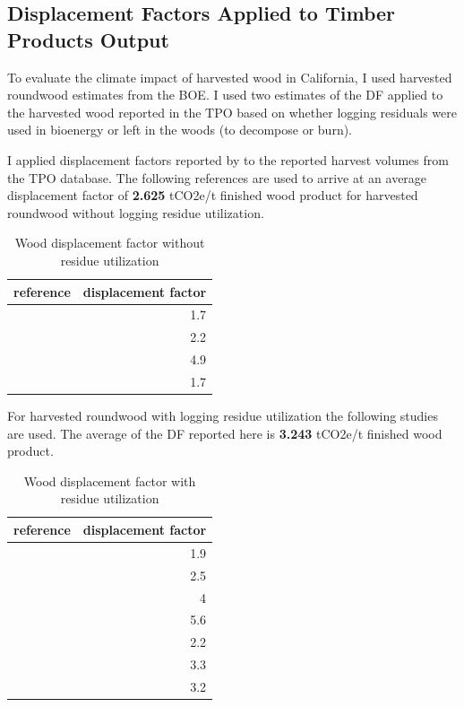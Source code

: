 \documentclass[a4paper,titlepage]{article}
\begin{document}
\subsection{Displacement Factors Applied to Timber Products Output}
\label{sec:orgheadline21}

To evaluate the climate impact of harvested wood in California, I used
harvested roundwood estimates from the \ac{BOE}. I used two estimates of the DF applied to the harvested wood reported in the TPO based on whether logging
residuals were used in bioenergy or left in the woods (to decompose or
burn).

I applied displacement factors reported by \cite{Sathre2010} to the reported harvest volumes from the TPO database.  The following references are used to arrive at an average displacement factor of \textbf{2.625} tCO2e/t finished wood product for harvested roundwood without
logging residue utilization.

\begin{table}[htb]
\centering
\begin{tabular}{lr}
reference & displacement factor\\
\hline
\citet{Eriksson2007} & 1.7\\
\citet{Eriksson2007} & 2.2\\
\citet{Salazar2009} & 4.9\\
\citet{Werner2005} & 1.7\\
\end{tabular}
\caption{Wood displacement factor without residue utilization \label{tab:df_no_use}}

\end{table}

For harvested roundwood with logging residue utilization the following
studies are used. The average of the DF reported here is \textbf{3.243} tCO2e/t finished wood product.


\begin{table}[htb]
\centering
\begin{tabular}{lr}
reference & displacement factor\\
\hline
\citet{Eriksson2007} & 1.9\\
\citet{Eriksson2007} & 2.5\\
\citet{Gustavsson2006a} & 4\\
\citet{Gustavsson2006a} & 5.6\\
\citet{Gustavsson2006a} & 2.2\\
\citet{Gustavsson2006a} & 3.3\\
\citet{Pingoud2001} & 3.2\\
\end{tabular}
\caption{Wood displacement factor with residue utilization \label{tab:df_inc_use}}

\end{table}
\end{document}
